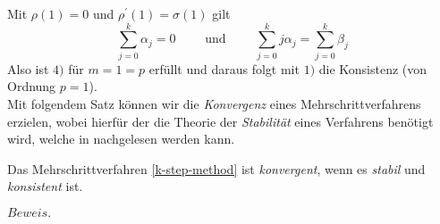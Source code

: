 Mit $\rho(1) = 0$ und $\rho^{\prime}(1)=\sigma(1)$ gilt
\[
    \sum_{j=0}^{k} \alpha_j = 0 \qquad \text{ und } \qquad \sum_{j=0}^{k} j \alpha_j = \sum_{j=0}^{k} \beta_j
\]
Also ist $4)$ für $m=1=p$ erfüllt und daraus folgt mit $1)$ die Konsistenz (von Ordnung $p=1$). \qedwhite \\
Mit folgendem Satz können wir die \textit{Konvergenz} eines Mehrschrittverfahrens erzielen, wobei hierfür der die
Theorie der \textit{Stabilität} eines Verfahrens benötigt wird, welche in
\cite[80]{ernsthairergerhardwannerSolvingOrdinaryDifferential} nachgelesen werden kann.
\begin{satz}
    Das Mehrschrittverfahren \eqref{k-step-method} ist {\em konvergent}, wenn es {\em stabil} und {\em konsistent} ist.
\end{satz}
$Beweis.$ \cite[392-393]{ernsthairergerhardwannerSolvingOrdinaryDifferential}
